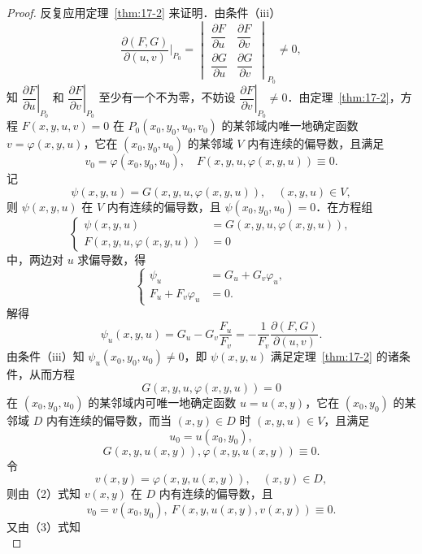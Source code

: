\begin{proof}
反复应用定理~\ref{thm:17-2} 来证明．由条件（iii）
\[
\frac{\partial(F,G)}{\partial(u,v)}\bigg|_{P_{0}}=\begin{vmatrix}\dfrac{\partial F}{\partial u}&\dfrac{\partial F}{\partial v}\\[8pt]\dfrac{\partial G}{\partial u}&\dfrac{\partial G}{\partial v}\end{vmatrix}_{P_{0}}\neq0,
\]
知 $\left.\dfrac{\partial F}{\partial u}\right|_{P_{0}}$ 和 $\left.\dfrac{\partial F}{\partial v}\right|_{P_{0}}$ 至少有一个不为零，不妨设 $\left.\dfrac{\partial F}{\partial v}\right|_{P_{0}}\neq0$．由定理~\ref{thm:17-2}，方程 $F(x,y,u,v)=0$ 在 $P_{0}(x_{0},y_{0},u_{0},v_{0})$ 的某邻域内唯一地确定函数 $v=\varphi(x,y,u)$，它在 $(x_{0},y_{0},u_{0})$ 的某邻域 $V$ 内有连续的偏导数，且满足
\begin{equation}
v_{0}=\varphi(x_{0},y_{0},u_{0}),\quad F(x,y,u,\varphi(x,y,u))\equiv0.
\tag{2}
\end{equation}
记
\[
\psi(x,y,u)=G(x,y,u,\varphi(x,y,u)),\quad(x,y,u)\in V,
\]
则 $\psi(x,y,u)$ 在 $V$ 内有连续的偏导数，且 $\psi(x_{0},y_{0},u_{0})=0$．在方程组
\[
\left\{\begin{aligned}
\psi(x,y,u)&=G(x,y,u,\varphi(x,y,u)),\\
F(x,y,u,\varphi(x,y,u))&=0
\end{aligned}\right.
\]
中，两边对 $u$ 求偏导数，得
\[
\left\{\begin{aligned}
\psi_{u}&=G_{u}+G_{v}\varphi_{u},\\
F_{u}+F_{v}\varphi_{u}&=0.
\end{aligned}\right.
\]
解得
\[
\psi_{u}(x,y,u)=G_{u}-G_{v}\frac{F_{u}}{F_{v}}=-\frac{1}{F_{v}}\frac{\partial(F,G)}{\partial(u,v)}.
\]
由条件（iii）知 $\psi_{u}(x_{0},y_{0},u_{0})\neq0$，即 $\psi(x,y,u)$ 满足定理~\ref{thm:17-2} 的诸条件，从而方程
\[
G(x,y,u,\varphi(x,y,u))=0
\]
在 $(x_{0},y_{0},u_{0})$ 的某邻域内可唯一地确定函数 $u=u(x,y)$，它在 $(x_{0},y_{0})$ 的某邻域 $D$ 内有连续的偏导数，而当 $(x,y)\in D$ 时 $(x,y,u)\in V$，且满足
\[
u_{0}=u(x_{0},y_{0}),
\]
\begin{equation}
G(x,y,u(x,y)),\varphi(x,y,u(x,y))\equiv0.
\tag{3}
\end{equation}
令
\[
v(x,y)=\varphi(x,y,u(x,y)),\quad(x,y)\in D,
\]
则由（2）式知 $v(x,y)$ 在 $D$ 内有连续的偏导数，且
\begin{equation}
v_{0}=v(x_{0},y_{0}),\ F(x,y,u(x,y),v(x,y))\equiv0.
\tag{4}
\end{equation}
又由（3）式知
\begin{equation}

\end{equation}
\end{proof}
